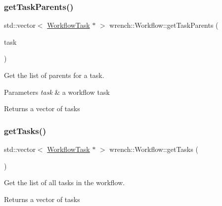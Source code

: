 \subsubsection{\texorpdfstring{get\+Task\+Parents()}{getTaskParents()}}
{\footnotesize\ttfamily std\+::vector$<$ \hyperlink{classwrench_1_1_workflow_task}{Workflow\+Task} $\ast$ $>$ wrench\+::\+Workflow\+::get\+Task\+Parents (\begin{DoxyParamCaption}\item[{const \hyperlink{classwrench_1_1_workflow_task}{Workflow\+Task} $\ast$}]{task }\end{DoxyParamCaption})}



Get the list of parents for a task. 


\begin{DoxyParams}{Parameters}
{\em task} & a workflow task\\
\hline
\end{DoxyParams}
\begin{DoxyReturn}{Returns}
a vector of tasks 
\end{DoxyReturn}
\mbox{\label{classwrench_1_1_workflow_abc742b44f0895ae2a42e60c63621f8aa}} 
\subsubsection{\texorpdfstring{get\+Tasks()}{getTasks()}}
{\footnotesize\ttfamily std\+::vector$<$ \hyperlink{classwrench_1_1_workflow_task}{Workflow\+Task} $\ast$ $>$ wrench\+::\+Workflow\+::get\+Tasks (\begin{DoxyParamCaption}{ }\end{DoxyParamCaption})}



Get the list of all tasks in the workflow. 

\begin{DoxyReturn}{Returns}
a vector of tasks 
\end{DoxyReturn}
\mbox{\label{classwrench_1_1_workflow_a7d8044bd686157c24b89c53810cb2b1b}} 
